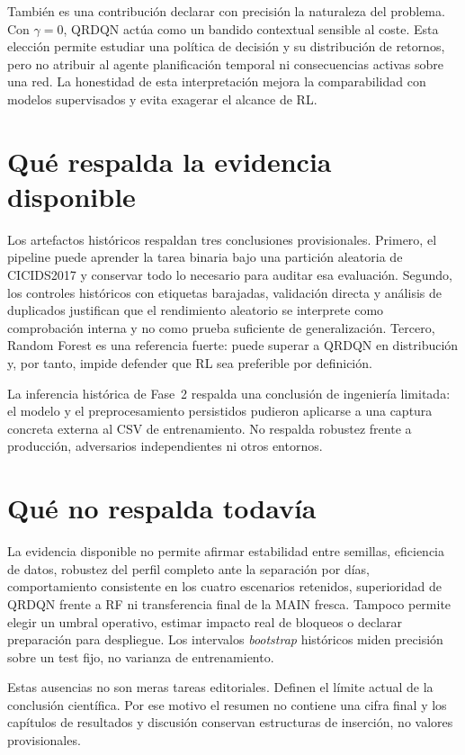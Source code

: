 También es una contribución declarar con precisión la naturaleza del problema. Con $\gamma=0$, QRDQN actúa como un bandido contextual sensible al coste. Esta elección permite estudiar una política de decisión y su distribución de retornos, pero no atribuir al agente planificación temporal ni consecuencias activas sobre una red. La honestidad de esta interpretación mejora la comparabilidad con modelos supervisados y evita exagerar el alcance de RL.

\section{Qué respalda la evidencia disponible}

Los artefactos históricos respaldan tres conclusiones provisionales. Primero, el pipeline puede aprender la tarea binaria bajo una partición aleatoria de CICIDS2017 y conservar todo lo necesario para auditar esa evaluación. Segundo, los controles históricos con etiquetas barajadas, validación directa y análisis de duplicados justifican que el rendimiento aleatorio se interprete como comprobación interna y no como prueba suficiente de generalización. Tercero, Random Forest es una referencia fuerte: puede superar a QRDQN en distribución y, por tanto, impide defender que RL sea preferible por definición.

La inferencia histórica de Fase~2 respalda una conclusión de ingeniería limitada: el modelo y el preprocesamiento persistidos pudieron aplicarse a una captura concreta externa al CSV de entrenamiento. No respalda robustez frente a producción, adversarios independientes ni otros entornos.

\section{Qué no respalda todavía}

La evidencia disponible no permite afirmar estabilidad entre semillas, eficiencia de datos, robustez del perfil completo ante la separación por días, comportamiento consistente en los cuatro escenarios retenidos, superioridad de QRDQN frente a RF ni transferencia final de la MAIN fresca. Tampoco permite elegir un umbral operativo, estimar impacto real de bloqueos o declarar preparación para despliegue. Los intervalos \emph{bootstrap} históricos miden precisión sobre un test fijo, no varianza de entrenamiento.

Estas ausencias no son meras tareas editoriales. Definen el límite actual de la conclusión científica. Por ese motivo el resumen no contiene una cifra final y los capítulos de resultados y discusión conservan estructuras de inserción, no valores provisionales.

